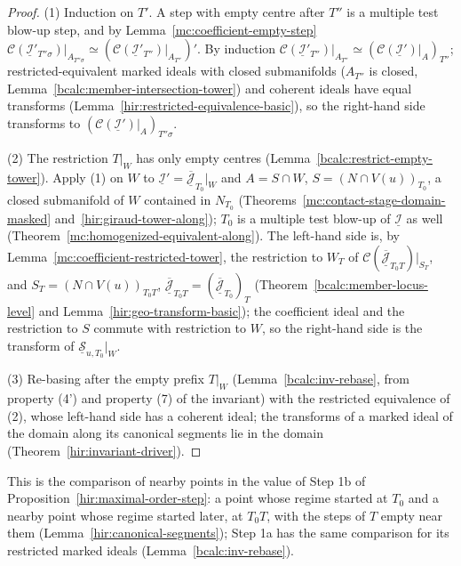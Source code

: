 \begin{proof}
\leanok
(1) Induction on \(T'\). A step with empty centre after \(T''\) is a multiple test blow-up step, and by Lemma~\ref{mc:coefficient-empty-step}
\(\mathcal C(\underline{\mathcal I}'_{T''\sigma})|_{A_{T''\sigma}}\simeq(\mathcal C(\underline{\mathcal I}'_{T''})|_{A_{T''}})'\). By induction
\(\mathcal C(\underline{\mathcal I}'_{T''})|_{A_{T''}}\simeq(\mathcal C(\underline{\mathcal I}')|_A)_{T''}\); restricted-equivalent marked ideals with closed submanifolds
(\(A_{T''}\) is closed, Lemma~\ref{bcalc:member-intersection-tower}) and coherent ideals have equal transforms (Lemma~\ref{hir:restricted-equivalence-basic}), so the
right-hand side transforms to \((\mathcal C(\underline{\mathcal I}')|_A)_{T''\sigma}\).

(2) The restriction \(T|_W\) has only empty centres (Lemma~\ref{bcalc:restrict-empty-tower}). Apply (1) on \(W\) to
\(\underline{\mathcal I}'=\overline{\underline{\mathcal J}}_{T_0}|_W\) and \(A=S\cap W\), \(S=(N\cap V(u))_{T_0}\), a closed submanifold of \(W\) contained in \(N_{T_0}\)
(Theorems~\ref{mc:contact-stage-domain-masked} and~\ref{hir:giraud-tower-along}); \(T_0\) is a multiple test blow-up of \(\underline{\mathcal I}\) as well
(Theorem~\ref{mc:homogenized-equivalent-along}). The left-hand side is, by Lemma~\ref{mc:coefficient-restricted-tower}, the restriction to \(W_T\) of
\(\mathcal C(\overline{\underline{\mathcal J}}_{T_0T})|_{S_T}\), and \(S_T=(N\cap V(u))_{T_0T}\), \(\overline{\underline{\mathcal J}}_{T_0T}=(\overline{\underline{\mathcal J}}_{T_0})_T\)
(Theorem~\ref{bcalc:member-locus-level} and Lemma~\ref{hir:geo-transform-basic}); the coefficient ideal and the restriction to \(S\) commute with restriction to \(W\), so the
right-hand side is the transform of \(\underline{\mathcal S}_{u,T_0}|_W\).

(3) Re-basing after the empty prefix \(T|_W\) (Lemma~\ref{bcalc:inv-rebase}, from property (4') and property (7) of the invariant) with the restricted
equivalence of (2), whose left-hand side has a coherent ideal; the transforms of a marked ideal of the domain along its canonical segments lie in the domain
(Theorem~\ref{hir:invariant-driver}).
\end{proof}
This is the comparison of nearby points in the value of Step 1b of Proposition~\ref{hir:maximal-order-step}: a point whose regime started at \(T_0\) and a
nearby point whose regime started later, at \(T_0T\), with the steps of \(T\) empty near them (Lemma~\ref{hir:canonical-segments}); Step 1a has the
same comparison for its restricted marked ideals (Lemma~\ref{bcalc:inv-rebase}).

